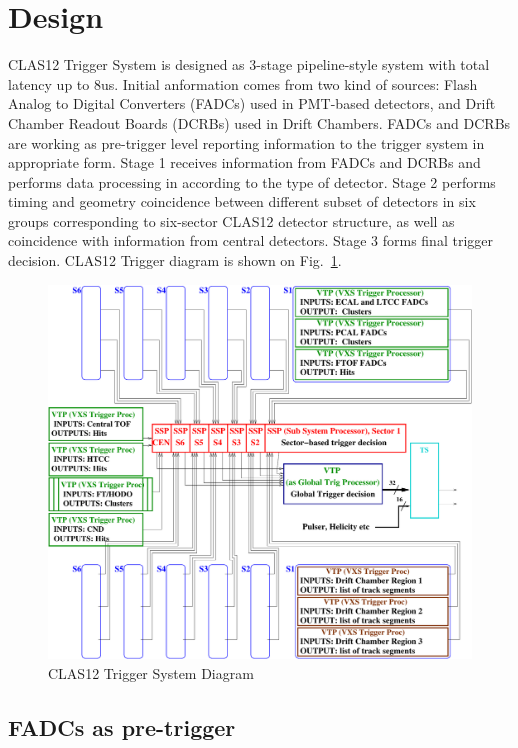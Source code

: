 \section{Design}

CLAS12 Trigger System is designed as 3-stage pipeline-style system with total latency up to 8us. Initial anformation comes from two kind of sources:  Flash Analog to Digital Converters (FADCs) used in PMT-based detectors, and Drift Chamber Readout Boards (DCRBs) used in Drift Chambers. FADCs and DCRBs are working as pre-trigger level reporting information to the trigger system in appropriate form. Stage 1 receives information from FADCs and DCRBs and performs data processing in according to the type of detector. Stage 2 performs timing and geometry coincidence between different subset of detectors in six groups corresponding to six-sector CLAS12 detector structure, as well as coincidence with information from central detectors. Stage 3 forms final trigger decision. CLAS12 Trigger diagram is shown on Fig.~\ref{fig:TriggerDiagram}.

\begin{figure}[hbt]
	\centering
	\includegraphics[width=1.0\columnwidth,keepaspectratio]{img/CLAS12_TRIGGER_1.pdf}
	\caption{CLAS12 Trigger System Diagram}
	\label{fig:TriggerDiagram}
\end{figure}


\subsection{FADCs as pre-trigger}

